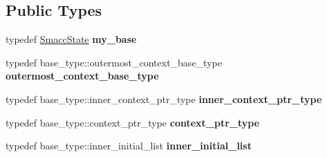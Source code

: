 \subsection*{Public Types}
\begin{DoxyCompactItemize}
\item 
\mbox{\label{classsmacc_1_1SmaccState_aac18be8c1314b97ccfd34cb28d1bb386}} 
typedef \hyperlink{classsmacc_1_1SmaccState}{Smacc\+State} {\bfseries my\+\_\+base}
\item 
\mbox{\label{classsmacc_1_1SmaccState_aaf76bbe2aa9dd73e3284605f84ab4b16}} 
typedef base\+\_\+type\+::outermost\+\_\+context\+\_\+base\+\_\+type {\bfseries outermost\+\_\+context\+\_\+base\+\_\+type}
\item 
\mbox{\label{classsmacc_1_1SmaccState_a65a772c2e2039e9a59148ba6ffb54d8a}} 
typedef base\+\_\+type\+::inner\+\_\+context\+\_\+ptr\+\_\+type {\bfseries inner\+\_\+context\+\_\+ptr\+\_\+type}
\item 
\mbox{\label{classsmacc_1_1SmaccState_a0e15b77514301039f6bc093a9d3f6425}} 
typedef base\+\_\+type\+::context\+\_\+ptr\+\_\+type {\bfseries context\+\_\+ptr\+\_\+type}
\item 
\mbox{\label{classsmacc_1_1SmaccState_acb4ac84bce421d39b594510a6b2df558}} 
typedef base\+\_\+type\+::inner\+\_\+initial\+\_\+list {\bfseries inner\+\_\+initial\+\_\+list}
\end{DoxyCompactItemize}
